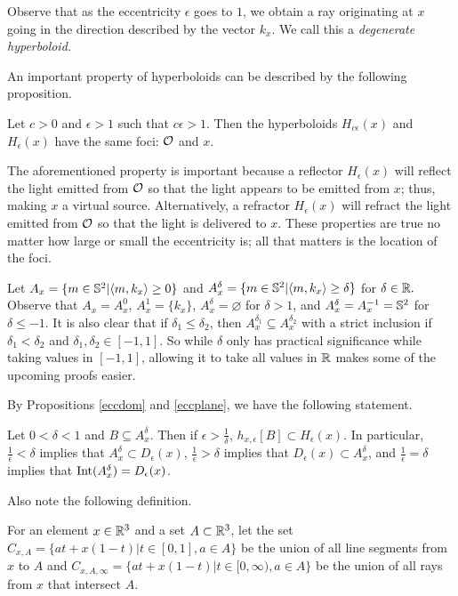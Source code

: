 \documentclass[review]{elsarticle}
\begin{document}
Observe that as the eccentricity $\epsilon$ goes to $1$, we obtain a ray originating at $x$ going in the direction described by the vector $k_x$. We call this a {\it degenerate hyperboloid.}

An important property of hyperboloids can be described by the following proposition. 

\begin{prop}
Let $c>0$ and $\epsilon>1$ such that $c\epsilon>1$. Then the hyperboloids $H_{c\epsilon}(x)$ and $H_{\epsilon}(x)$ have the same foci: $\mathcal{O}$ and $x$.
\end{prop}

The aforementioned property is important because a reflector $H_\epsilon(x)$ will reflect the light emitted from $\mathcal{O}$ so that the light appears to be emitted from $x$; thus, making $x$ a virtual source. Alternatively, a refractor $H_\epsilon(x)$ will refract the light emitted from $\mathcal{O}$ so that the light is delivered to $x$. These properties are true no matter how large or small the eccentricity is; all that matters is the location of the foci. 

Let $A_x=\{m\in \mathbb{S}^2| \langle m,k_x \rangle \ge 0\}$ and $A_x^\delta =\{m\in \mathbb{S}^2| \langle m,k_x \rangle \ge \delta\}$ for $\delta \in \mathbb{R}.$ Observe that $A_x=A_x^0$, $A_x^1=\{k_x\}$, $A_x^\delta= \varnothing$ for $\delta> 1$, and $A_x^\delta= A_x^{-1}=\mathbb{S}^2$ for $\delta \le -1$. It is also clear that if $\delta_1\le \delta_2$, then  $A_x^{\delta_1}\subseteq A_x^{\delta_2}$ with a strict inclusion if $\delta_1< \delta_2$ and $\delta_1,\delta_2\in [-1,1]$. So while $\delta$ only has practical significance while taking values in $[-1,1]$, allowing it to take all values in $\mathbb{R}$ makes some of the upcoming proofs easier.

By Propositions \ref{eccdom} and \ref{eccplane}, we have the following statement.

\begin{prop}\label{geoprop}
Let $0<\delta<1$ and $B\subseteq A_x^\delta$. Then if $\epsilon>\frac1\delta$, $h_{x,\epsilon}[B] \subset H_\epsilon(x).$ In particular, $\frac1{\epsilon}<\delta$ implies that $A_x^\delta\subset D_\epsilon(x)$, $\frac1{\epsilon}>\delta$ implies that $D_\epsilon(x)\subset A_x^\delta$, and $\frac1{\epsilon}=\delta$ implies that $\textnormal{Int}(A_x^\delta)= D_\epsilon(x)$.
\end{prop}           

Also note the following definition. 

\begin{Def}\label{cone-def}
For an element $x\in\mathbb{R}^3$ and a set $A\subset\mathbb{R}^3$, let the set $C_{x,A}=\{at+x(1-t)|t\in[0,1],a\in A\}$ be the union of all line segments from $x$ to $A$ and $C_{x,A,\infty}=\{at+x(1-t)|t\in[0,\infty),a\in A\}$ be the union of all rays from $x$ that intersect $A$.
\end{Def}
\end{document}
